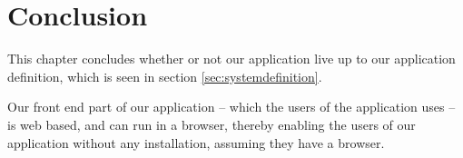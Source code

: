 \chapter{Conclusion}
\label{chap:conclusion}
This chapter concludes whether or not our application live up to our application definition, which is seen in section \ref{sec:systemdefinition}.

Our front end part of our application -- which the users of the application uses -- is web based, and can run in a browser, thereby enabling the users of our application without any installation, assuming they have a browser.














\begin{comment}
We initiated this project with a comprehensive project proposal -- seen in appendix \ref{app:projectProposal} -- which meant that we could start the analysis-phase immediately.
This went hand-in-hand with the \ooad{} method which we have been taught in the SAD course.
The \ooad{} method resulted in a comprehensive analysis and design phase, which we documented immediately afterwards.
We then chose to use the MVC design pattern, which -- due to the programming language of choice, C\# the ASP.NET MVC 2 framework, which took a relatively large amount of time to learn.
During this learning phase, we realized that we had to redo and change a lot of the decisions we made during the design phase, as well as reinterpret some parts from the analysis, in order to use the ASP.NET MVC 2 framework for our implementation.
Due to the limited amount of time we had left, we were forced to make these decisions, which not always led to a better and more intuitive application.
This led to a rather large improvements chapter; \ref{chap:future_work}.
We did not document our developed application until we decided that we were done developing, where after the remaining time were spent documenting our application, as well as decisions which were made during the development part.
We reflected upon our process and choices, and suggested ideas for if we were to start over.




\end{comment}
